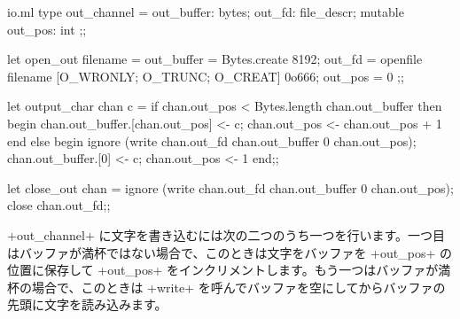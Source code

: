 \begin{myimage}[width="85\%"]
\end{myimage}
%
\begin{listingcodefile}{io.ml}
type out_channel =
  { out_buffer: bytes;
    out_fd: file_descr;
    mutable out_pos: int };;

let open_out filename =
  { out_buffer = Bytes.create 8192;
    out_fd = openfile filename [O_WRONLY; O_TRUNC; O_CREAT] 0o666;
    out_pos = 0 };;

let output_char chan c =
  if chan.out_pos < Bytes.length chan.out_buffer then begin
    chan.out_buffer.[chan.out_pos] <- c;
    chan.out_pos <- chan.out_pos + 1
  end else begin
    ignore (write chan.out_fd chan.out_buffer 0 chan.out_pos);
    chan.out_buffer.[0] <- c;
    chan.out_pos <- 1
  end;;

let close_out chan =
  ignore (write chan.out_fd chan.out_buffer 0 chan.out_pos);
  close chan.out_fd;;
\end{listingcodefile}
%
\ml+out_channel+ に文字を書き込むには次の二つのうち一つを行います。一つ目はバッファが満杯ではない場合で、このときは文字をバッファを \ml+out_pos+ の位置に保存して \ml+out_pos+ をインクリメントします。もう一つはバッファが満杯の場合で、このときは \ml+write+ を呼んでバッファを空にしてからバッファの先頭に文字を読み込みます。

